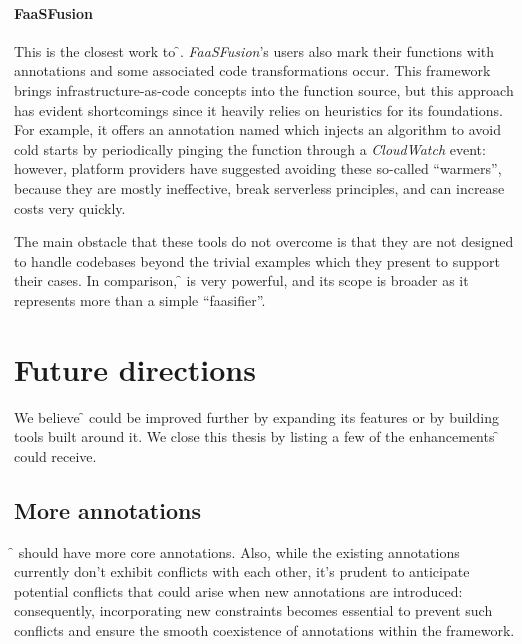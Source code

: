 \paragraph{\textbf{FaaSFusion} \cite{faasfusion}}
This is the closest work to \f{}.
\textit{FaaSFusion}'s users also mark their functions with annotations
and some associated code transformations occur.
This framework brings infrastructure-as-code concepts into the function source,
but this approach has evident shortcomings since it heavily relies on heuristics for its foundations.
For example, it offers an annotation named  which
injects an algorithm to avoid cold starts by periodically pinging the function
through a \textit{CloudWatch} event:
however, platform providers have suggested avoiding these so-called ``warmers'',
because they are mostly ineffective, break serverless principles, and can increase costs very quickly.

The main obstacle that these tools do not overcome is that they are
not designed to handle codebases beyond the trivial examples
which they present to support their cases.
In comparison, \f{} is very powerful, and its scope is broader
as it represents more than a simple ``faasifier''.

\section{Future directions}

We believe \f{} could be improved further by expanding its features
or by building tools built around it.
We close this thesis by listing a few of the enhancements \f{} could receive.

\subsection{More annotations}

\f{} should have more core annotations.
Also, while the existing annotations currently don't exhibit conflicts with each other,
it's prudent to anticipate potential conflicts that could arise when new annotations are introduced:
consequently, incorporating new constraints becomes essential to prevent such
conflicts and ensure the smooth coexistence of annotations within the framework.

